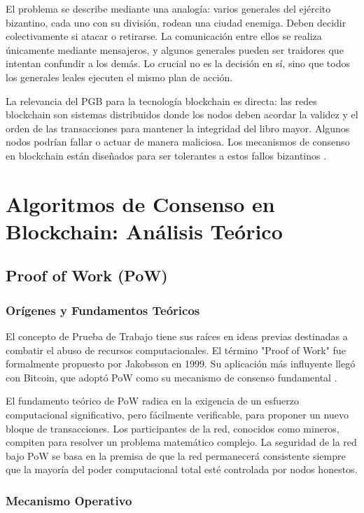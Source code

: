 \documentclass[spanish,12pt,letterpaper]{report}
\begin{document}
El problema se describe mediante una analogía: varios generales del ejército bizantino, cada uno con su división, rodean una ciudad enemiga. Deben decidir colectivamente si atacar o retirarse. La comunicación entre ellos se realiza únicamente mediante mensajeros, y algunos generales pueden ser traidores que intentan confundir a los demás. Lo crucial no es la decisión en sí, sino que todos los generales leales ejecuten el mismo plan de acción.

La relevancia del PGB para la tecnología blockchain es directa: las redes blockchain son sistemas distribuidos donde los nodos deben acordar la validez y el orden de las transacciones para mantener la integridad del libro mayor. Algunos nodos podrían fallar o actuar de manera maliciosa. Los mecanismos de consenso en blockchain están diseñados para ser tolerantes a estos fallos bizantinos \parencite{castro1999practical}.

\section{Algoritmos de Consenso en Blockchain: Análisis Teórico}

\subsection{Proof of Work (PoW)}

\subsubsection{Orígenes y Fundamentos Teóricos}

El concepto de Prueba de Trabajo tiene sus raíces en ideas previas destinadas a combatir el abuso de recursos computacionales. El término "Proof of Work" fue formalmente propuesto por Jakobsson en 1999. Su aplicación más influyente llegó con Bitcoin, que adoptó PoW como su mecanismo de consenso fundamental \parencite{nakamoto2008bitcoin}.

El fundamento teórico de PoW radica en la exigencia de un esfuerzo computacional significativo, pero fácilmente verificable, para proponer un nuevo bloque de transacciones. Los participantes de la red, conocidos como mineros, compiten para resolver un problema matemático complejo. La seguridad de la red bajo PoW se basa en la premisa de que la red permanecerá consistente siempre que la mayoría del poder computacional total esté controlada por nodos honestos.

\subsubsection{Mecanismo Operativo}
\end{document}

